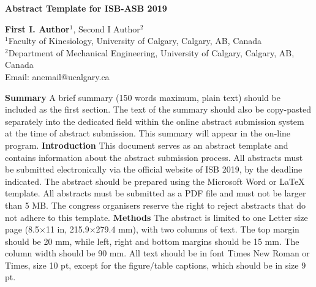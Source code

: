 \documentclass[10pt]{article}
\begin{document}
\centering
\textbf{Abstract Template for ISB-ASB 2019} \par
\vspace{10pt}
\textbf{First I. Author$^1$}, Second I Author$^2$ \\
$^1$Faculty of Kinesiology, University of Calgary, Calgary, AB, Canada \\
$^2$Department of Mechanical Engineering, University of Calgary, Calgary, AB, Canada \\
Email: {anemail@ucalgary.ca} \vspace{5pt}

\begin{multicols}{2}
\justify
\textbf{Summary} \vspace{5pt} \newline
A brief summary (150 words maximum, plain text) should be included as the first section. The text of the summary should also be copy-pasted separately into the dedicated field within the online abstract submission system at the time of abstract submission. This summary will appear in the on-line program. \vspace{10pt} \newline
\textbf{Introduction} \vspace{5pt} \newline
This document serves as an abstract template and contains information about the abstract submission process. All abstracts must be submitted electronically via the official website of ISB 2019, by the deadline indicated. \vspace{5pt} \newline
The abstract should be prepared using the Microsoft Word or LaTeX template. All abstracts must be submitted as a PDF file and must not be larger than 5 MB. The congress organisers reserve the right to reject abstracts that do not adhere to this template. \vspace{10pt} \newline
\textbf{Methods} \vspace{5pt} \newline
The abstract is limited to one Letter size page (8.5$\times$11 in, 215.9$\times$279.4 mm), with two columns of text. The top margin should be 20 mm, while left, right and bottom margins should be 15 mm. The column width should be 90 mm. All text should be in font Times New Roman or Times, size 10 pt, except for the figure$/$table captions, which should be in size 9 pt. \vspace{5pt} \newline

\end{multicols}
\end{document}
